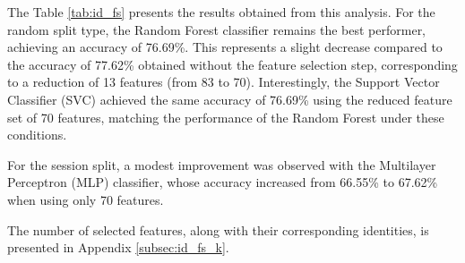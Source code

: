 \documentclass[12pt]{report}
\begin{document}
The Table \ref{tab:id_fs} presents the results obtained from this analysis.
For the random split type, the Random Forest classifier remains the best performer, achieving an accuracy of 76.69\%.
This represents a slight decrease compared to the accuracy of 77.62\% obtained without the feature selection step, corresponding to a reduction of 13 features (from 83 to 70).
Interestingly, the Support Vector Classifier (SVC) achieved the same accuracy of 76.69\% using the reduced feature set of 70 features, matching the performance of the Random Forest under these conditions.

For the session split, a modest improvement was observed with the Multilayer Perceptron (MLP) classifier, whose accuracy increased from 66.55\% to 67.62\% when using only 70 features.

The number of selected features, along with their corresponding identities, is presented in Appendix \ref{subsec:id_fs_k}.
\end{document}

